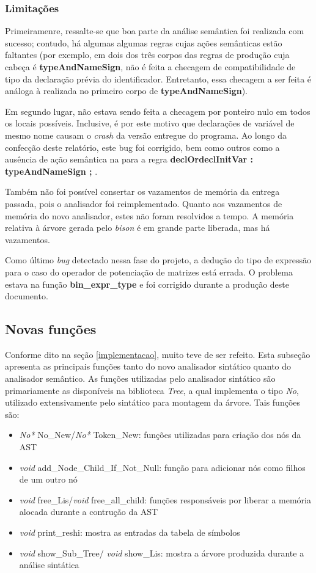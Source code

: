 \documentclass[
	article,			%
	11pt,				%
	oneside,			%
	a4paper,			%
	english,			%
	brazil,				%
	sumario=tradicional
	]{abntex2}
\renewcommand{\it}[1]{\textit{#1}}
\renewcommand{\bf}[1]{\textbf{#1}}
\begin{document}
\subsubsection{Limitações}

Primeiramenre, ressalte-se que boa parte da análise semântica foi realizada com sucesso; contudo, há algumas algumas regras cujas ações semânticas estão faltantes (por exemplo, em dois dos três corpos das regras de produção cuja cabeça é \bf{typeAndNameSign}, não é feita a checagem de compatibilidade de tipo da declaração prévia do identificador. Entretanto, essa checagem a ser feita é análoga à realizada no primeiro corpo de \bf{typeAndNameSign}).

Em segundo lugar, não estava sendo feita a checagem por ponteiro nulo em todos os locais possíveis. Inclusive, é por este motivo que declarações de variável de mesmo nome causam o \it{crash} da versão entregue do programa. Ao longo da confecção deste relatório, este bug foi corrigido, bem como outros como a ausência de ação semântica na para a regra \bf{declOrdeclInitVar : typeAndNameSign ;} .

Também não foi possível consertar os vazamentos de memória da entrega passada, pois o analisador foi reimplementado. Quanto aos vazamentos de memória do novo analisador, estes não foram resolvidos a tempo. A memória relativa à árvore gerada pelo \it{bison} é em grande parte liberada, mas há vazamentos.

Como último \it{bug} detectado nessa fase do projeto, a dedução do tipo de expressão para o caso do operador de potenciação de matrizes está errada. O problema estava na função \bf{bin\_expr\_type} e foi corrigido durante a produção deste documento.

\subsection{Novas funções}

Conforme dito na seção \ref{implementacao}, muito teve de ser refeito. Esta subseção apresenta as principais funções tanto do novo analisador sintático quanto do analisador semântico. As funções utilizadas pelo analisador sintático são primariamente as disponíveis na biblioteca \it{Tree}, a qual implementa o tipo \it{No}, utilizado extensivamente pelo sintático para montagem da árvore. Tais funções são:
\begin{itemize}
	\item \it{No*} No\_New/\it{No*} Token\_New: funções utilizadas para criação dos nós da AST
	\item \it{void} add\_Node\_Child\_If\_Not\_Null: função para adicionar nós como filhos de um outro nó
	\item \it{void} free\_Lis/\it{void} free\_all\_child: funções responsáveis por liberar a memória alocada  durante a contrução da AST
	\item \it{void} print\_reshi: mostra as entradas da tabela de símbolos
	\item \it{void} show\_Sub\_Tree/ \it{void} show\_Lis: mostra a árvore produzida durante a análise sintática
\end{itemize}
\end{document}
